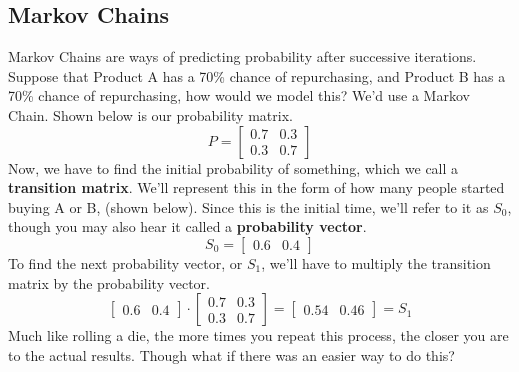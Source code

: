 \documentclass[final,1p,12pt]{elsarticle}
\begin{document}
    \subsection{Markov Chains}
    Markov Chains are ways of predicting probability after successive iterations.
    Suppose that Product A has a 70\% chance of repurchasing, and Product B has a 70\% chance of repurchasing, how would we model this? We'd use a Markov Chain. Shown below is our probability matrix.
    \begin{equation*}
        P = 
        \begin{bmatrix}
            0.7 & 0.3\\
            0.3 & 0.7
        \end{bmatrix}
    \end{equation*}
    Now, we have to find the initial probability of something, which we call a \textbf{transition matrix}. We'll represent this in the form of how many people started buying A or B, (shown below). Since this is the initial time, we'll refer to it as $S_{0}$, though you may also hear it called a \textbf{probability vector}.
    \begin{equation*}
    S_{0} = 
        \begin{bmatrix}
            0.6 & 0.4
        \end{bmatrix}
    \end{equation*}
    To find the next probability vector, or $S_{1}$, we'll have to multiply the transition matrix by the probability vector.
    \begin{equation*}
        \begin{bmatrix}
            0.6 & 0.4
        \end{bmatrix}
        \cdot
        \begin{bmatrix}
            0.7 & 0.3\\
            0.3 & 0.7
        \end{bmatrix}
        =
        \begin{bmatrix}
            0.54 & 0.46
        \end{bmatrix}
        = S_{1}
    \end{equation*}
    Much like rolling a die, the more times you repeat this process, the closer you are to the actual results. Though what if there was an easier way to do this?
    
\end{document}
